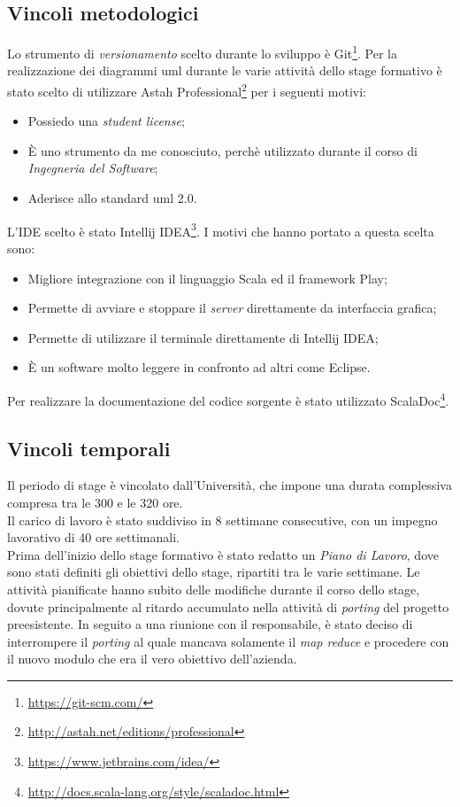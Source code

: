 \subsection{Vincoli metodologici}
Lo strumento di \textit{versionamento} scelto durante lo sviluppo è Git\footnote{\url{https://git-scm.com/}}.
Per la realizzazione dei diagrammi \gls{uml} durante le varie attività dello stage formativo è stato scelto di utilizzare Astah Professional\footnote{\url{http://astah.net/editions/professional}} per i seguenti motivi:
\begin{itemize}
	\item Possiedo una \textit{student license};
	\item È uno strumento da me conosciuto, perchè utilizzato durante il corso di \textit{Ingegneria del Software};
	\item Aderisce allo standard \gls{uml} 2.0.	
\end{itemize}
L'\gls{IDE} scelto è stato Intellij IDEA\footnote{\url{https://www.jetbrains.com/idea/}}. I motivi che hanno portato a questa scelta sono:
\begin{itemize}
	\item Migliore integrazione con il linguaggio Scala ed il \gls{framework} Play;
	\item Permette di avviare e stoppare il \textit{server} direttamente da interfaccia grafica;
	\item Permette di utilizzare il terminale direttamente di Intellij IDEA;
	\item È un software molto leggere in confronto ad altri come Eclipse.
\end{itemize}
Per realizzare la documentazione del codice sorgente è stato utilizzato ScalaDoc\footnote{\url{http://docs.scala-lang.org/style/scaladoc.html}}.

\subsection{Vincoli temporali}
Il periodo di stage è vincolato dall'Università, che impone una durata complessiva compresa tra le 300 e le 320 ore.\\
Il carico di lavoro è stato suddiviso in 8 settimane consecutive, con un impegno lavorativo di 40 ore settimanali.\\
Prima dell'inizio dello stage formativo è stato redatto un \textit{Piano di Lavoro}, dove sono stati definiti gli obiettivi dello stage, ripartiti tra le varie settimane. Le attività pianificate hanno subito delle modifiche durante il corso dello stage, dovute principalmente al ritardo accumulato nella attività di \textit{porting} del progetto preesistente. In seguito a una riunione con il responsabile, è stato deciso di interrompere il \textit{porting} al quale mancava solamente il \textit{map reduce} e procedere con il nuovo modulo che era il vero obiettivo dell'azienda.